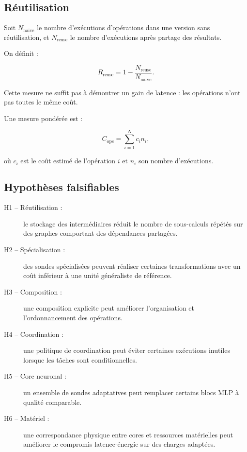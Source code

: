 \documentclass[11pt,a4paper]{article}
\begin{document}
\subsection{Réutilisation}

Soit $N_{\mathrm{naive}}$ le nombre d'exécutions d'opérations dans
une version sans réutilisation, et $N_{\mathrm{reuse}}$ le nombre
d'exécutions après partage des résultats.

On définit :

\[
R_{\mathrm{reuse}}
=
1-
\frac{N_{\mathrm{reuse}}}{N_{\mathrm{naive}}}.
\]

Cette mesure ne suffit pas à démontrer un gain de latence :
les opérations n'ont pas toutes le même coût.

Une mesure pondérée est :

\[
C_{\mathrm{ops}}
=
\sum_{i=1}^{N}
c_i n_i,
\]

où $c_i$ est le coût estimé de l'opération $i$ et $n_i$ son nombre
d'exécutions.

\subsection{Hypothèses falsifiables}

\begin{description}
  \item[H1 -- Réutilisation :]
  le stockage des intermédiaires réduit le nombre de sous-calculs
  répétés sur des graphes comportant des dépendances partagées.

  \item[H2 -- Spécialisation :]
  des sondes spécialisées peuvent réaliser certaines transformations
  avec un coût inférieur à une unité généraliste de référence.

  \item[H3 -- Composition :]
  une composition explicite peut améliorer l'organisation et
  l'ordonnancement des opérations.

  \item[H4 -- Coordination :]
  une politique de coordination peut éviter certaines exécutions
  inutiles lorsque les tâches sont conditionnelles.

  \item[H5 -- Core neuronal :]
  un ensemble de sondes adaptatives peut remplacer certains blocs
  MLP à qualité comparable.

  \item[H6 -- Matériel :]
  une correspondance physique entre cores et ressources matérielles
  peut améliorer le compromis latence-énergie sur des charges adaptées.
\end{description}
\end{document}
